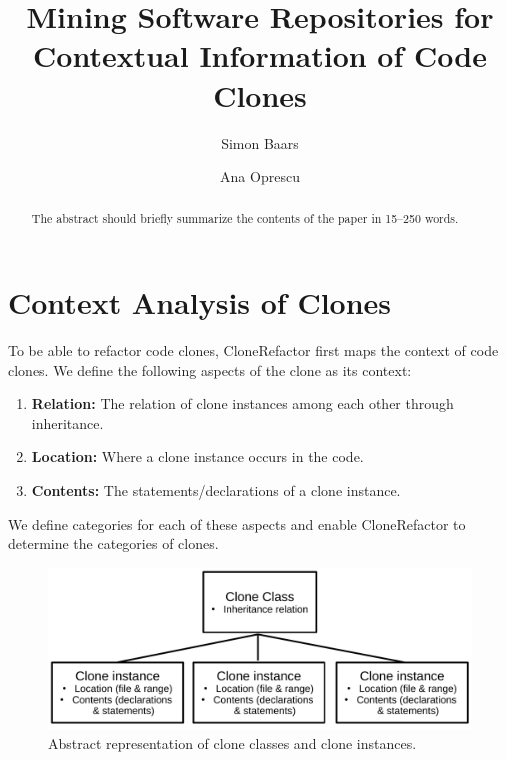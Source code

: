 \documentclass[runningheads]{llncs}
\begin{document}
%
\title{Mining Software Repositories for Contextual Information of Code Clones}
%
%
\author{Simon Baars \and
Ana Oprescu}
%
%
%
\maketitle              %
%
\begin{abstract}
The abstract should briefly summarize the contents of the paper in
15--250 words.

\end{abstract}
%
%
%
\section{Context Analysis of Clones}\label{chap:contextsetup}
To be able to refactor code clones, CloneRefactor first maps the context of code clones. We define the following aspects of the clone as its context:
\begin{enumerate}
  \item \textbf{Relation:} The relation of clone instances among each other through inheritance.
  \item \textbf{Location:} Where a clone instance occurs in the code.
  \item \textbf{Contents:} The statements/declarations of a clone instance.
\end{enumerate}
We define categories for each of these aspects and enable CloneRefactor to determine the categories of clones.

\begin{figure}[H]
  \centering
    \includegraphics[width=0.8\columnwidth]{img/context}
    \caption{Abstract representation of clone classes and clone instances.}
  \label{fig:clonecontext}
\end{figure}
\end{document}
